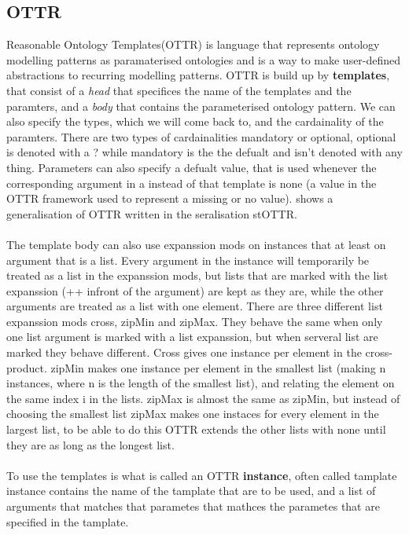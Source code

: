 \subsection{OTTR}
Reasonable Ontology Templates(OTTR) is language that represents ontology modelling patterns as paramaterised 
ontologies and is a way to make user-defined abstractions to recurring modelling patterns. 
OTTR is build up by \textbf{templates}, that consist of a \textit{head} that specifices the name of the templates
and the paramters, and a \textit{body} that contains the parameterised ontology pattern. We can also specify the types, which we will come back to, 
and the cardainality of the paramters. There are two types of cardainalities mandatory or optional, optional is denoted with 
a ? while mandatory is the the defualt and isn't denoted with any thing. Parameters can also specify a defualt value, that is used 
whenever the corresponding argument in a instead of that template is none (a value in the OTTR framework used to represent a missing or no value). 
 shows a generalisation of OTTR written in the seralisation stOTTR.
\\ \\
The template body can also use expanssion mods on instances that 
at least on argument that is a list. Every argument in the instance will temporarily be treated as a list in the expanssion mods, but lists that 
are marked with the list expanssion (++ infront of the argument) are kept as they are, while the other arguments are treated as 
a list with one element. There are three different list expanssion mods cross, zipMin and zipMax. They behave the same when only one list argument
is marked with a list expanssion, but when serveral list are marked they behave different. Cross gives one instance per element in the cross-product. zipMin 
makes one instance per element in the smallest list (making n instances, where n is the length of the smallest list), and relating the element on the same index 
i in the lists. zipMax is almost the same as zipMin, but instead of choosing the smallest list zipMax makes one instaces for every element in the largest list,
to be able to do this OTTR extends the other lists with none until they are as long as the longest list.   
\\ \\
To use the templates is what is called an OTTR \textbf{instance}, often called tamplate instance contains the name of the tamplate that are to be used, 
and a list of arguments that matches that parametes that mathces the parametes that are specified in the tamplate. 
